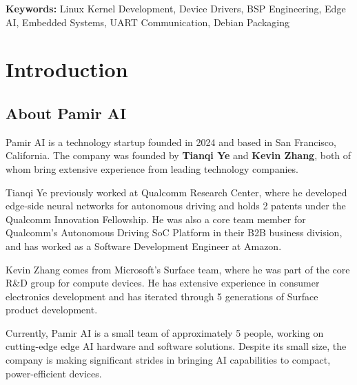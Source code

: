\documentclass[12pt,a4paper]{report}
\begin{document}
\noindent
\textbf{Keywords:} Linux Kernel Development, Device Drivers, BSP Engineering, Edge AI, Embedded Systems, UART Communication, Debian Packaging

\newpage
\tableofcontents

\newpage
{}

\chapter{Introduction}

\section{About Pamir AI}

Pamir AI is a technology startup founded in 2024 and based in San Francisco, California. The company was founded by \textbf{Tianqi Ye} and \textbf{Kevin Zhang}, both of whom bring extensive experience from leading technology companies.

\vspace{0.3cm}

Tianqi Ye previously worked at Qualcomm Research Center, where he developed edge-side neural networks for autonomous driving and holds 2 patents under the Qualcomm Innovation Fellowship. He was also a core team member for Qualcomm's Autonomous Driving SoC Platform in their B2B business division, and has worked as a Software Development Engineer at Amazon.

\vspace{0.3cm}

Kevin Zhang comes from Microsoft's Surface team, where he was part of the core R\&D group for compute devices. He has extensive experience in consumer electronics development and has iterated through 5 generations of Surface product development.

\vspace{0.3cm}

Currently, Pamir AI is a small team of approximately 5 people, working on cutting-edge edge AI hardware and software solutions. Despite its small size, the company is making significant strides in bringing AI capabilities to compact, power-efficient devices.
\end{document}
